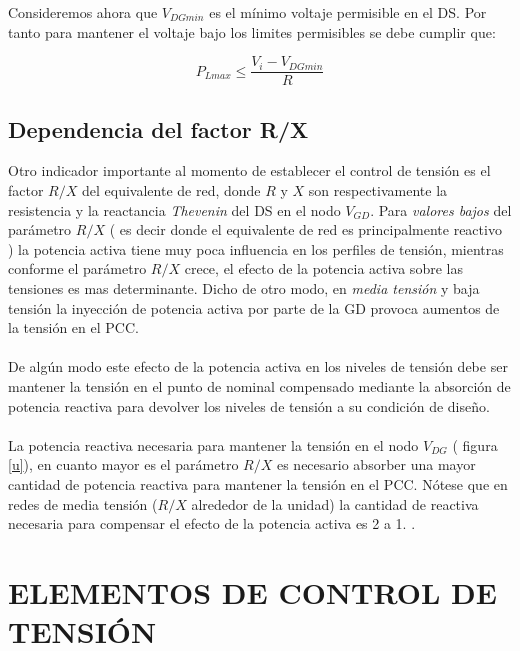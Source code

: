 \documentclass[12pt, letterpaper]{report}
\begin{document}
Consideremos ahora que $V_{DGmin}$ es el mínimo voltaje permisible en el DS. Por tanto para mantener el voltaje bajo los limites permisibles  se debe cumplir que:

\[P_{Lmax} \leq \dfrac{V_{i} - V_{DGmin}}{R}\]

\subsection{Dependencia del factor R/X}
Otro indicador importante al momento de establecer el control de tensión es el factor $ R/X$ del equivalente de red, donde $R$  y $X$ son respectivamente la resistencia y la reactancia  \textit{Thevenin} del DS en el nodo $V_{GD}$.    Para \textit{valores bajos} del parámetro $R/X$ ( es decir donde el equivalente de red es principalmente reactivo ) la potencia activa tiene muy poca  influencia en los perfiles de tensión, mientras conforme el parámetro $R/X$ crece, el efecto de la potencia activa sobre las tensiones es mas determinante. Dicho de otro modo, en \textit{media tensión } y baja tensión la inyección de potencia activa por parte de la GD provoca aumentos de la tensión en el PCC.\\\\
De algún modo este efecto de la potencia activa en los niveles de tensión debe ser mantener la tensión en el punto de nominal compensado mediante la absorción de potencia reactiva para devolver los niveles de tensión a su condición de diseño.\\\\
La potencia reactiva necesaria para mantener la tensión en el nodo $ V_{DG}$ ( figura \ref{u}), en cuanto mayor es el parámetro $R/X$ es necesario absorber una mayor cantidad de potencia reactiva  para mantener la tensión en el PCC. Nótese que en redes de media tensión ($R/X$ alrededor de la unidad) la cantidad de  reactiva necesaria para compensar el efecto de la potencia activa es 2 a 1. \cite{trebolle2012control}.



\section{ELEMENTOS DE CONTROL DE TENSIÓN}
\end{document}
